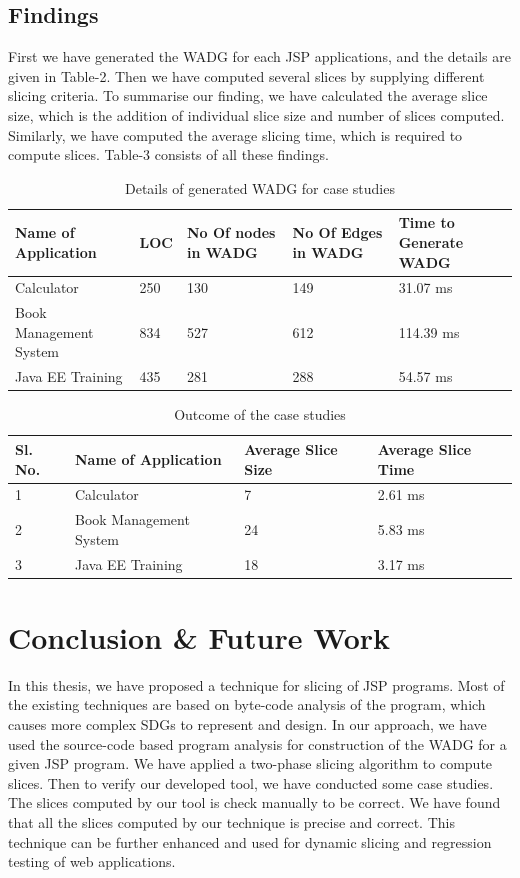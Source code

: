 \documentclass[11pt]{article}   %
\begin{document}
\subsection{Findings}
First we have generated the WADG for each JSP applications, and the details are given in Table-2. Then we have computed several slices by supplying different slicing criteria. To summarise our finding, we have calculated the average slice size, which is the addition of individual slice size and number of slices computed. Similarly, we have computed the average slicing time, which is required to compute slices. Table-3 consists of all these findings.

\begin{table}[htb]
 \centering
  \caption{Details of generated WADG for case studies}
\label{tab1}
{ 
 \begin{tabular}{|l|l|p{3cm}|p{3cm}|p{3cm}|}
 \hline \bf{Name of Application}& \bf{LOC}& \bf{No Of nodes in WADG}& \bf{No Of Edges in WADG}& \bf{Time to Generate WADG} \\
 \hline  Calculator &  250 & 130 & 149 & 31.07 ms\\
 \hline  Book Management System &  834 & 527 & 612 & 114.39 ms\\
 \hline  Java EE Training  &  435 & 281 & 288 & 54.57 ms\\
  \hline   
          \end{tabular}
 }\end{table} 
 

 \begin{table}[htb]
 \centering
  \caption{Outcome of the case studies}
\label{tab1}
{ 
 \begin{tabular}{|l|l|l|l|}
 \hline  \bf{Sl. No.} & \bf{Name of Application}& \bf{Average Slice Size}& \bf{Average Slice Time}\\
     \hline  {1} & {Calculator} & {7} & {2.61 ms}\\
     \hline  {2} & {Book Management System} & {24} & {5.83 ms}\\
     \hline  {3} & {Java EE Training} & {18} & {3.17 ms}\\
  \hline   
          \end{tabular}
 }
 \end{table}

\section{Conclusion \& Future Work}
In this thesis, we have proposed a technique for slicing
of JSP programs. Most of the existing techniques are based on byte-code analysis of the program, which causes more
complex SDGs to represent and design. In our approach, we
have used the source-code based program analysis for construction of the WADG for a given JSP program. We have applied a two-phase slicing algorithm to compute slices. Then to verify our developed tool, we have conducted some case studies. The slices computed by our tool is check manually to be correct. We have found that all the slices computed by our technique is precise and correct. This technique can be further enhanced and used for dynamic slicing and   regression testing of web applications.



\end{document}
